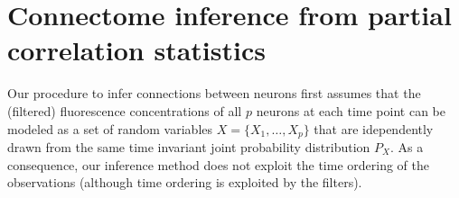 \documentclass[wcp]{jmlr}
\begin{document}
\section{Connectome inference from partial correlation statistics}
\label{sec:inference}


Our procedure to infer connections between neurons first assumes that
the (filtered) fluorescence concentrations of all $p$ neurons at each
time point can be modeled as a set of random variables $X = \{X_1,
\dots, X_p\}$ that are idependently drawn from the same time invariant
joint probability distribution $P_X$. %
As a consequence, our inference method does not exploit the time
ordering of the observations (although time ordering is exploited by
the filters).

\end{document}
